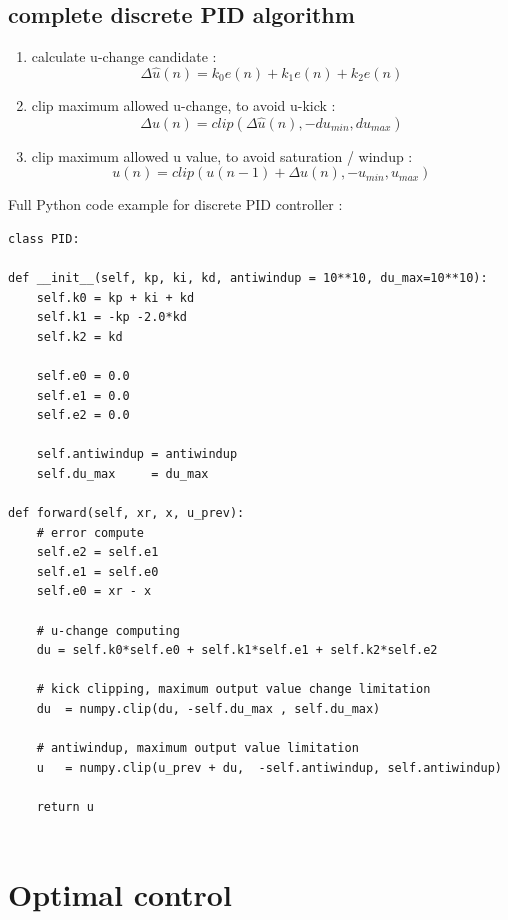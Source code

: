 \documentclass[12pt,twoside,onecolumn,openany,extrafontsizes,dvipsnames]{memoir}
\begin{document}
            \newpage
            \subsection{complete discrete PID algorithm}  
    
                \begin{enumerate}
                  \item  calculate u-change candidate :
                    $$\Delta \hat{u}(n) = k_0e(n) + k_1e(n) + k_2e(n)$$
                  
                  \item clip maximum allowed u-change, to avoid u-kick :
                    $$\Delta u(n) = clip(\Delta \hat{u}(n), -du_{min}, du_{max})$$
              
                  \item clip maximum allowed u value, to avoid saturation / windup :
                    $$u(n) = clip(u(n-1) + \Delta u(n), -u_{min}, u_{max})$$
                \end{enumerate}

                Full Python code example for discrete PID controller :
                \begin{lstlisting}[style=python_style]
class PID:

def __init__(self, kp, ki, kd, antiwindup = 10**10, du_max=10**10):
    self.k0 = kp + ki + kd
    self.k1 = -kp -2.0*kd
    self.k2 = kd

    self.e0 = 0.0
    self.e1 = 0.0
    self.e2 = 0.0
    
    self.antiwindup = antiwindup
    self.du_max     = du_max

def forward(self, xr, x, u_prev):
    # error compute
    self.e2 = self.e1
    self.e1 = self.e0
    self.e0 = xr - x

    # u-change computing
    du = self.k0*self.e0 + self.k1*self.e1 + self.k2*self.e2

    # kick clipping, maximum output value change limitation
    du  = numpy.clip(du, -self.du_max , self.du_max)

    # antiwindup, maximum output value limitation
    u   = numpy.clip(u_prev + du,  -self.antiwindup, self.antiwindup)

    return u


                \end{lstlisting}


    \newpage
    \section{Optimal control}
        
\end{document}
